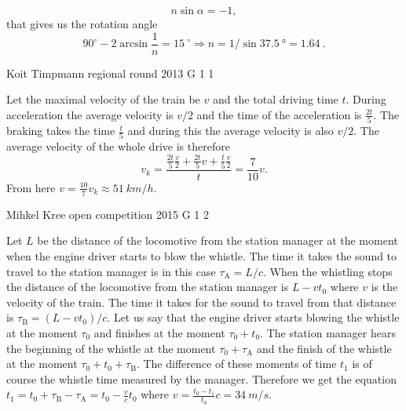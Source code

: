 \documentclass[11pt]{article}
\begin{document}
{$$n\sin\alpha=-1,$$
that gives us the rotation angle 
$$90^\circ-2\arcsin \frac 1n=\SI{15}{}^\circ\Rightarrow n=1/\sin \SI{37,5}{\degree} = \SI{1,64}{}.$$
\fi
}

{Koit Timpmann} %
{regional round} %
{2013} %
{G 1} %
{1} %
{

\ifEngSolution
Let the maximal velocity of the train be $v$ and the total driving time $t$. During acceleration the average velocity is $v/2$ and the time of the acceleration is $\frac{2t}{5}$. The braking takes the time $\frac{t}{5}$ and during this the average velocity is also $v/2$. The average velocity of the whole drive is therefore
$$v_k = \frac{\frac{2t}{5} \frac{v}{2}+\frac{2t}{5} v + \frac{t}{5} \frac{v}{2}}{t} = \frac{7}{10} v.$$
From here $v=\frac{10}{7}v_k \approx \SI{51}{km/h}$.
\fi
}

{Mihkel Kree} %
{open competition} %
{2015} %
{G 1} %
{2} %
{

\ifEngSolution
Let $L$ be the distance of the locomotive from the station manager at the moment when the engine driver starts to blow the whistle. The time it takes the sound to travel to the station manager is in this case $\tau_\text{A}=L/c$. When the whistling stops the distance of the locomotive from the station manager is $L-vt_0$ where $v$ is the velocity of the train. The time it takes for the sound to travel from that distance is $\tau_\text{B}=(L-vt_0)/c$. Let us say that the engine driver starts blowing the whistle at the moment $\tau_0$ and finishes at the moment $\tau_0+t_0$. The station manager hears the beginning of the whistle at the moment $\tau_0+\tau_\text{A}$ and the finish of the whistle at the moment $\tau_0+t_0+\tau_\text{B}$. The difference of these moments of time $t_1$ is of course the whistle time measured by the manager. Therefore we get the equation $t_1 = t_0+\tau_\text{B}-\tau_\text{A} = t_0 - \frac{v}{c}t_0$ where $v = \frac{t_0-t_1}{t_0}c = \SI{34}{m/s}$.
\fi
}
\end{document}
